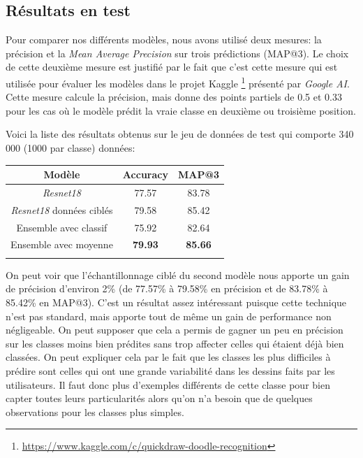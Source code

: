 
\subsection{Résultats en test}

Pour comparer nos différents modèles, nous avons utilisé deux mesures: la précision et la \emph{Mean Average Precision} sur trois prédictions (MAP@3).
Le choix de cette deuxième mesure est justifié par le fait que c'est cette mesure qui est utilisée pour évaluer les modèles dans le projet Kaggle \footnote{\url{https://www.kaggle.com/c/quickdraw-doodle-recognition}} présenté par \emph{Google AI}.
Cette mesure calcule la précision, mais donne des points partiels de 0.5 et 0.33 pour les cas où le modèle prédit la vraie classe en deuxième ou troisième position.

Voici la liste des résultats obtenus sur le jeu de données de test qui comporte 340 000 (1000 par classe) données:

\begin{center}
\setlength{\tabcolsep}{2mm}
\begin{tabular}{c c c}
\toprule
\textbf{Modèle} & \textbf{Accuracy} & \textbf{MAP@3}  \\

\midrule

\textit{Resnet18} & 77.57&83.78 \\
\textit{Resnet18} données ciblés  &79.58&85.42 \\
Ensemble avec classif  & 75.92 &82.64       \\
Ensemble avec moyenne     & \textbf{79.93}&\textbf{85.66}        \\



\bottomrule
\addlinespace[3mm]
\end{tabular}
\end{center}

On peut voir que l'échantillonnage ciblé du second modèle nous apporte un gain de précision d'environ 2\% (de 77.57\% à 79.58\% en précision et de 83.78\% à 85.42\% en MAP@3). 
C'est un résultat assez intéressant puisque cette technique n'est pas standard, mais apporte tout de même un gain de performance non négligeable. 
On peut supposer que cela a permis de gagner un peu en précision sur les classes moins bien prédites sans trop affecter celles qui étaient déjà bien classées.
On peut expliquer cela par le fait que les classes les plus difficiles à prédire sont celles qui ont une grande variabilité dans les dessins faits par les utilisateurs. 
Il faut donc plus d'exemples différents de cette classe pour bien capter toutes leurs particularités alors qu'on n'a besoin que de quelques observations pour les classes plus simples.


